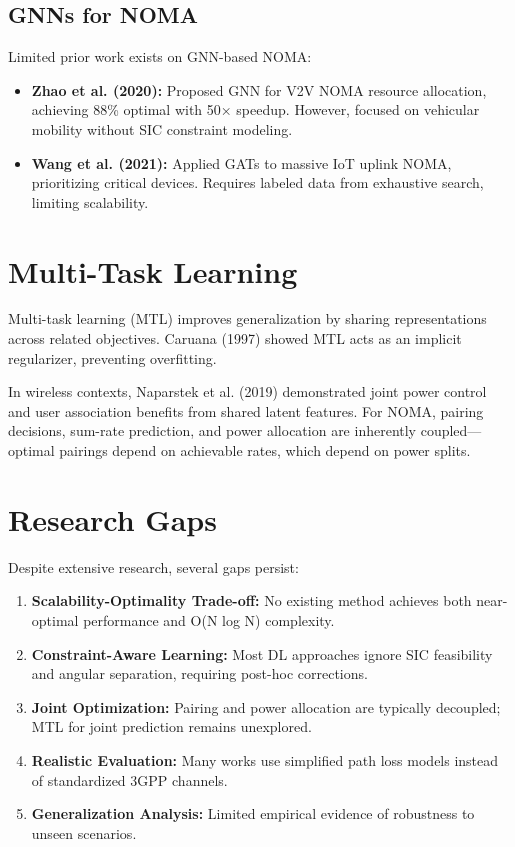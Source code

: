 \subsection{GNNs for NOMA}

Limited prior work exists on GNN-based NOMA:

\begin{itemize}
    \item \textbf{Zhao et al. (2020):} Proposed GNN for V2V NOMA resource allocation, achieving 88\% optimal with 50× speedup. However, focused on vehicular mobility without SIC constraint modeling.
    
    \item \textbf{Wang et al. (2021):} Applied GATs to massive IoT uplink NOMA, prioritizing critical devices. Requires labeled data from exhaustive search, limiting scalability.
\end{itemize}

\section{Multi-Task Learning}

Multi-task learning (MTL) improves generalization by sharing representations across related objectives. Caruana (1997) showed MTL acts as an implicit regularizer, preventing overfitting.

In wireless contexts, Naparstek et al. (2019) \cite{naparstek2019deep} demonstrated joint power control and user association benefits from shared latent features. For NOMA, pairing decisions, sum-rate prediction, and power allocation are inherently coupled—optimal pairings depend on achievable rates, which depend on power splits.

\section{Research Gaps}

Despite extensive research, several gaps persist:

\begin{enumerate}
    \item \textbf{Scalability-Optimality Trade-off:} No existing method achieves both near-optimal performance and O(N log N) complexity.
    
    \item \textbf{Constraint-Aware Learning:} Most DL approaches ignore SIC feasibility and angular separation, requiring post-hoc corrections.
    
    \item \textbf{Joint Optimization:} Pairing and power allocation are typically decoupled; MTL for joint prediction remains unexplored.
    
    \item \textbf{Realistic Evaluation:} Many works use simplified path loss models instead of standardized 3GPP channels.
    
    \item \textbf{Generalization Analysis:} Limited empirical evidence of robustness to unseen scenarios.
\end{enumerate}

